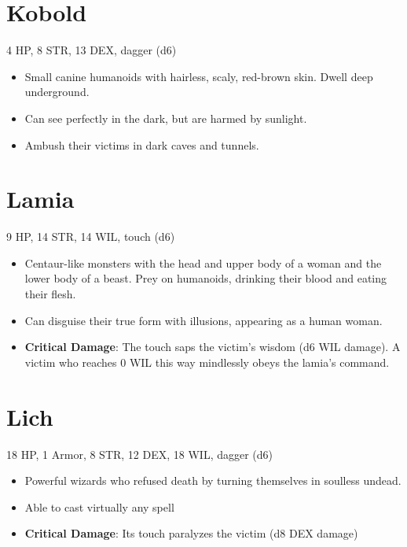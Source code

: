 \documentclass[
  10pt,
  american,
]{article}
\begin{document}
\hypertarget{kobold}{%
\section{Kobold}\label{kobold}}

4 HP, 8 STR, 13 DEX, dagger (d6)

\begin{samepage}
\begin{itemize}
\setlength\itemsep{-.5em}
\item Small canine humanoids with hairless, scaly, red-brown skin. Dwell deep underground.
\item Can see perfectly in the dark, but are harmed by sunlight.
\item Ambush their victims in dark caves and tunnels.
\end{itemize}
\end{samepage}

\hypertarget{lamia}{%
\section{Lamia}\label{lamia}}

9 HP, 14 STR, 14 WIL, touch (d6)

\begin{samepage}
\begin{itemize}
\setlength\itemsep{-.5em}
\item Centaur-like monsters with the head and upper body of a woman and the lower body of a beast. Prey on humanoids, drinking their blood and eating their flesh.
\item Can disguise their true form with illusions, appearing as a human woman.
\item \textbf{Critical Damage}: The touch saps the victim's wisdom (d6 WIL damage). A victim who reaches 0 WIL this way mindlessly obeys the lamia's command.
\end{itemize}
\end{samepage}

\hypertarget{lich}{%
\section{Lich}\label{lich}}

18 HP, 1 Armor, 8 STR, 12 DEX, 18 WIL, dagger (d6)

\begin{samepage}
\begin{itemize}
\setlength\itemsep{-.5em}
\item Powerful wizards who refused death by turning themselves in soulless undead.
\item Able to cast virtually any spell
\item \textbf{Critical Damage}: Its touch paralyzes the victim (d8 DEX damage)
\end{itemize}
\end{samepage}
\end{document}
